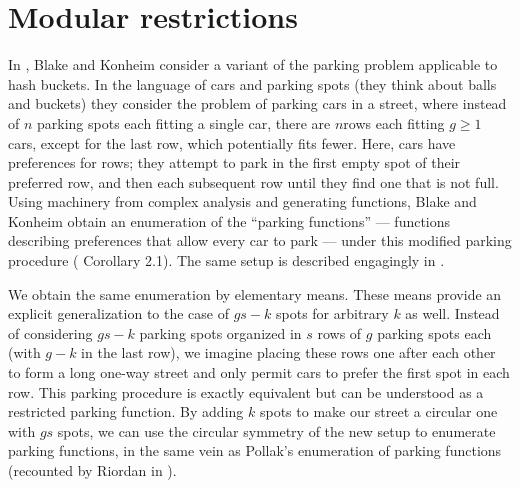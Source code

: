 \documentclass[12 pt]{amsart}
\theoremstyle{definition} %
\theoremstyle{remark} %
\begin{document}
\section{Modular restrictions \label{modularsection}}

In \cite{blake-konheim-1977}, Blake and Konheim consider a variant of the parking problem applicable to hash buckets. In the language of cars and parking spots (they think about balls and buckets) they consider the problem of parking cars in a street, where instead of $n$ parking spots each fitting a single car, there are $n $rows each fitting $g\ge 1$ cars, except for the last row, which potentially fits fewer. Here, cars have preferences for rows; they attempt to park in the first empty spot of their preferred row, and then each subsequent row until they find one that is not full. Using machinery from complex analysis and generating functions, Blake and Konheim obtain an enumeration of the ``parking functions'' --- functions describing preferences that allow every car to park --- under this modified parking procedure (\cite{blake-konheim-1977} Corollary 2.1). The same setup is described engagingly in \cite{carlson-harris-2020}.

We obtain the same enumeration by elementary means. These means provide an explicit generalization to the case of $gs - k$ spots for arbitrary $k$ as well. Instead of considering $gs - k$ parking spots organized in $s$ rows of $g$ parking spots each (with $g - k$ in the last row), we imagine placing these rows one after each other to form a long one-way street and only permit cars to prefer the first spot in each row. This parking procedure is exactly equivalent but can be understood as a restricted parking function. By adding $k$ spots to make our street a circular one with $gs$ spots, we can use the circular symmetry of the new setup to enumerate parking functions, in the same vein as Pollak's enumeration of parking functions (recounted by Riordan in \cite{riordan-1969}).
\end{document}

